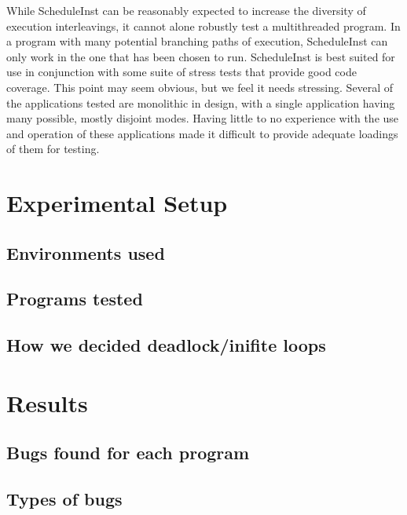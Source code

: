 \documentclass[10pt,]{article} %
\begin{document}

	While ScheduleInst can be reasonably expected to increase the diversity of execution interleavings, it cannot alone robustly test a multithreaded program.  In a program with many potential branching paths of execution, ScheduleInst can only work in the one that has been chosen to run.   ScheduleInst is best suited for use in conjunction with some suite of stress tests that provide good code coverage.  This point may seem obvious, but we feel it needs stressing.  Several of the applications tested are monolithic in design, with a single application having many possible, mostly disjoint modes.  Having little to no experience with the use and operation of these applications made it difficult to provide adequate loadings of them for testing. 



\section{Experimental Setup}


\subsection{Environments used}

\subsection{Programs tested}
	
\subsection{How we decided deadlock/inifite loops}


\section{Results}


\subsection{Bugs found for each program}

\subsection{Types of bugs}
\end{document}
